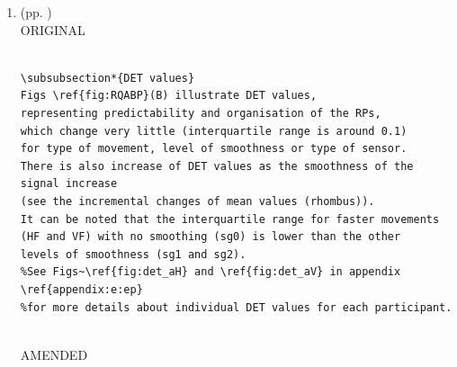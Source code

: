 \documentclass[10pt]{article}
\begin{document}
\begin{enumerate}
\begin{verbatim}
\end{verbatim}

AMENDED
\begin{verbatim}
Figs~\ref{fig:RQABP}(A) show box plots of REC values 
that represent the \% of black dots in RPs.
It can be noted that REC values are more spread 
for HN and VN movements (higher interquartile range) than 
for HF and VF movements (lower interquartile range) for HS01 sensor. 
In contrast, REC values for RS01 sensor present little variation 
(interquartile range of 0.01).
Regarding the increase of smoothness for time series 
(sg0, sg1 and sg2), REC values present little 
variation as the smoothness is increasing for time series from HS01 
(changes of mean values (rhombus)) whereas REC values are 
more affected with the smoothness for data from RS01 
(see the incremental changes of mean values (rhombus)).
%See Figs~\ref{fig:rec_aH} and \ref{fig:rec_aV} in appendix \ref{appendix:e:ep} 
%for more details about individual REC values for each participant.


\end{verbatim}

\textit{
LOG: \\ 
Mon 13 Apr 17:06:01 BST 2020
}
\\




\item  (pp. ) \\
ORIGINAL
\begin{verbatim}

\subsubsection*{DET values}
Figs \ref{fig:RQABP}(B) illustrate DET values, 
representing predictability and organisation of the RPs, 
which change very little (interquartile range is around 0.1) 
for type of movement, level of smoothness or type of sensor.
There is also increase of DET values as the smoothness of the signal increase 
(see the incremental changes of mean values (rhombus)).
It can be noted that the interquartile range for faster movements
(HF and VF) with no smoothing (sg0) is lower than the other
levels of smoothness (sg1 and sg2).
%See Figs~\ref{fig:det_aH} and \ref{fig:det_aV} in appendix \ref{appendix:e:ep} 
%for more details about individual DET values for each participant.


\end{verbatim}

AMENDED
\begin{verbatim}


\end{verbatim}
\end{enumerate}
\end{document}
